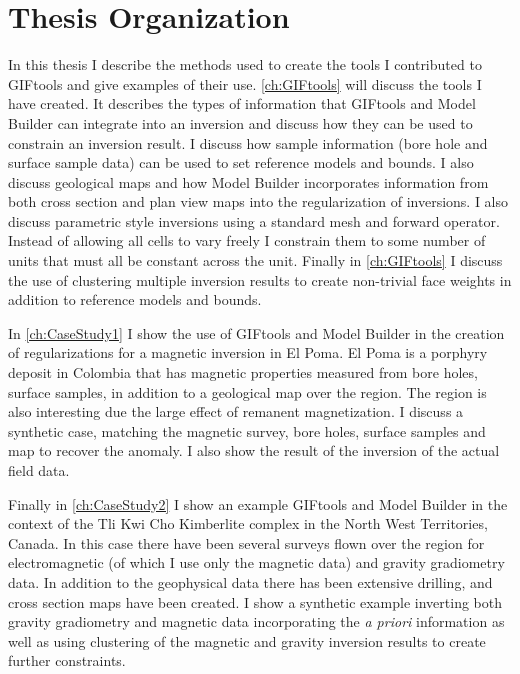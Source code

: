 \section{Thesis Organization}
\label{sec:Thesis Organization}
		
In this thesis I describe the methods used to create the tools I contributed to GIFtools and give examples of their use. \autoref{ch:GIFtools} will discuss the tools I have created. It  describes the types of information that GIFtools and Model Builder can integrate into an inversion and discuss how they can be used to constrain an inversion result. I discuss how sample information (bore hole and surface sample data) can be used to set reference models and bounds. I also discuss geological maps and how Model Builder incorporates information from both cross section and plan view maps into the regularization of inversions. I also discuss parametric style inversions using a standard mesh and forward operator. Instead of allowing all cells to vary freely I constrain them to some number of units that must all be constant across the unit. Finally in \autoref{ch:GIFtools}  I discuss the use of clustering multiple inversion results to create non-trivial face weights in addition to reference models and bounds.

In \autoref{ch:CaseStudy1} I show the use of GIFtools and Model Builder in the creation of regularizations for a magnetic inversion in El Poma. El Poma is a porphyry deposit in Colombia that has magnetic properties measured from bore holes, surface samples, in addition to a geological map over the region. The region is also interesting due the large effect of remanent magnetization. I discuss a synthetic case, matching the magnetic survey, bore holes, surface samples and map to recover the anomaly. I also show the result of the inversion of the actual field data.

Finally in \autoref{ch:CaseStudy2} I show an example GIFtools and Model Builder in the context of the Tli Kwi Cho Kimberlite complex in the North West Territories, Canada. In this case there have been several surveys flown over the region for electromagnetic (of which I use only the magnetic data) and gravity gradiometry data. In addition to the geophysical data there has been extensive drilling, and cross section maps have been created. I show a synthetic example inverting both gravity gradiometry and magnetic data incorporating the \emph{a priori} information as well as using clustering of the magnetic and gravity inversion results to create further constraints.







\endinput

Interestingly, the assumption that all magnetizations are in the same direction also assumes that all Koenigsberger ratios are equal.

Any text after an \endinput is ignored.
You could put scraps here or things in progress.
